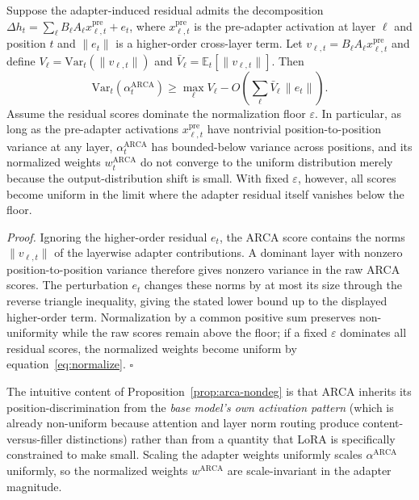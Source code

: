 \begin{proposition}
\label{prop:arca-nondeg}
Suppose the adapter-induced residual admits the decomposition $\Delta h_t =
\sum_\ell B_\ell A_\ell x_{\ell,t}^{\mathrm{pre}} + e_t$, where
$x_{\ell,t}^{\mathrm{pre}}$ is the pre-adapter activation at layer $\ell$ and
position $t$ and $\|e_t\|$ is a higher-order cross-layer term. Let
$v_{\ell,t} = B_\ell A_\ell x_{\ell,t}^{\mathrm{pre}}$ and define
$V_\ell = \mathrm{Var}_t(\|v_{\ell,t}\|)$ and $\bar{V}_\ell =
\mathbb{E}_t[\|v_{\ell,t}\|]$. Then
\[
\mathrm{Var}_t(\alpha_t^{\mathrm{ARCA}}) \ge \max_\ell V_\ell
- O\!\left(\sum_{\ell}\bar{V}_\ell \, \|e_t\|\right).
\]
Assume the residual scores dominate the normalization floor $\varepsilon$.
In particular, as long as the pre-adapter activations
$x_{\ell,t}^{\mathrm{pre}}$ have nontrivial position-to-position variance at
any layer, $\alpha_t^{\mathrm{ARCA}}$ has bounded-below variance across
positions, and its normalized weights $w_t^{\mathrm{ARCA}}$ do not converge
to the uniform distribution merely because the output-distribution shift is
small. With fixed $\varepsilon$, however, all scores become uniform in the
limit where the adapter residual itself vanishes below the floor.
\end{proposition}

\noindent\emph{Proof.}
Ignoring the higher-order residual $e_t$, the ARCA score contains the norms
$\|v_{\ell,t}\|$ of the layerwise adapter contributions. A dominant layer with
nonzero position-to-position variance therefore gives nonzero variance in the
raw ARCA scores. The perturbation $e_t$ changes these norms by at most its
size through the reverse triangle inequality, giving the stated lower bound up
to the displayed higher-order term. Normalization by a common positive sum
preserves non-uniformity while the raw scores remain above the floor; if a
fixed $\varepsilon$ dominates all residual scores, the normalized weights
become uniform by equation~\eqref{eq:normalize}. \hfill$\square$

The intuitive content of Proposition~\ref{prop:arca-nondeg} is that ARCA
inherits its position-discrimination from the \emph{base model's own
activation pattern} (which is already non-uniform because attention and
layer norm routing produce content-versus-filler distinctions) rather than
from a quantity that LoRA is specifically constrained to make small. Scaling
the adapter weights uniformly scales $\alpha^{\mathrm{ARCA}}$ uniformly, so
the normalized weights $w^{\mathrm{ARCA}}$ are scale-invariant in the
adapter magnitude.

